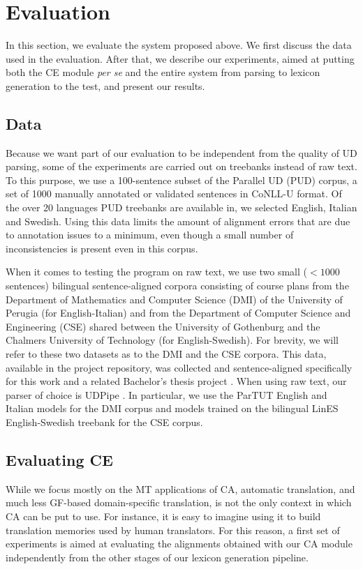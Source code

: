 \documentclass[11pt]{article}
\begin{document}
\section{Evaluation} \label{evaluation}
In this section, we evaluate the system proposed above. 
We first discuss the data used in the evaluation. 
After that, we describe our experiments, aimed at putting both the CE module \textit{per se} and the entire system from parsing to lexicon generation to the test, and present our results.

\subsection{Data} \label{data}
Because we want part of our evaluation to be independent from the quality of UD parsing, some of the experiments are carried out on treebanks instead of raw text. 
To this purpose, we use a 100-sentence subset of the Parallel UD (PUD) corpus, a set of 1000 manually annotated or validated sentences in CoNLL-U format.
Of the over 20 languages PUD treebanks are available in, we selected English, Italian and Swedish. 
Using this data limits the amount of alignment errors that are due to annotation issues to a minimum, even though a small number of inconsistencies is present even in this corpus.

When it comes to testing the program on raw text, we use two small ($< 1000$ sentences) bilingual sentence-aligned corpora consisting of course plans from the Department of Mathematics and Computer Science (DMI) of the University of Perugia (for English-Italian) and from the Department of Computer Science and Engineering (CSE) shared between the University of Gothenburg and the Chalmers University of Technology (for English-Swedish). 
For brevity, we will refer to these two datasets as to the DMI and the CSE corpora.
This data, available in the project repository, was collected and sentence-aligned specifically for this work and a related Bachelor's thesis project \cite{thesis}.
When using raw text, our parser of choice is UDPipe \cite{straka-etal-2016-udpipe}. 
In particular, we use the ParTUT English and Italian models for the DMI corpus and models trained on the bilingual LinES English-Swedish treebank for the CSE corpus.

\subsection{Evaluating CE} \label{ceval}
While we focus mostly on the MT applications of CA, automatic translation, and much less GF-based domain-specific translation, is not the only context in which CA can be put to use. 
For instance, it is easy to imagine using it to build translation memories used by human translators.
For this reason, a first set of experiments is aimed at evaluating the alignments obtained with our CA module independently from the other stages of our lexicon generation pipeline.
\end{document}
